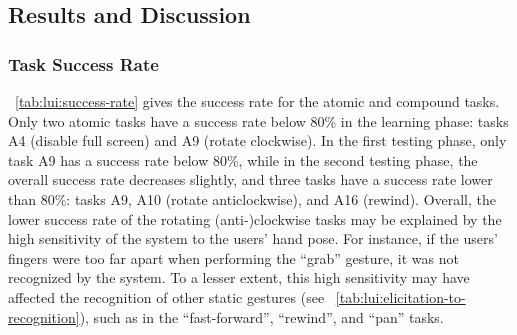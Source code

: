 \subsection{Results and Discussion} \label{sec:lui:evaluation:results}
\subsubsection{Task Success Rate}
\tab~\ref{tab:lui:success-rate} gives the success rate for the atomic and compound tasks.
Only two atomic tasks have a success rate below 80\% in the learning phase: tasks A4 (disable full screen) and A9 (rotate clockwise). In the first testing phase, only task A9 has a success rate below 80\%, while in the second testing phase, the overall success rate decreases slightly, and three tasks have a success rate lower than 80\%: tasks A9, A10 (rotate anticlockwise), and A16 (rewind). 
Overall, the lower success rate of the rotating (anti-)clockwise tasks may be explained by the high sensitivity of the system to the users' hand pose. For instance, if the users' fingers were too far apart when performing the ``grab'' gesture, it was not recognized by the system. To a lesser extent, this high sensitivity may have affected the recognition of other static gestures (see \tab~\ref{tab:lui:elicitation-to-recognition}), such as in the ``fast-forward'', ``rewind'', and ``pan'' tasks.

